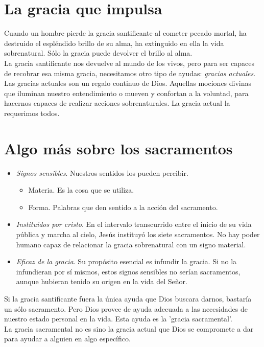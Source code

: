 \documentclass{article}
\begin{document}
    \section*{La gracia que impulsa}
       Cuando un hombre pierde la gracia santificante al cometer pecado mortal, ha destruido el espléndido brillo de su alma, ha extinguido en ella la vida sobrenatural. Sólo la gracia puede devolver el brillo al alma.\\ 
       La gracia santificante nos devuelve al mundo de los vivos, pero para ser capaces de recobrar esa misma gracia, necesitamos otro tipo de ayudas: \textit{gracias actuales}.\\ 
       Las gracias actuales son un regalo continuo de Dios. Aquellas mociones divinas que iluminan nuestro entendimiento o mueven y confortan a la voluntad, para hacernos capaces de realizar acciones sobrenaturales. La gracia actual la requerimos todos.
    \section*{Algo más sobre los sacramentos}
       \begin{itemize}
            \item \textit{Signos sensibles}. Nuestros sentidos los pueden percibir. 
            \begin{itemize}
                \item Materia. Es la cosa que se utiliza.
                \item Forma. Palabras que den sentido a la acción del sacramento. 
            \end{itemize}
            \item \textit{Instituidos por cristo}. En el intervalo transcurrido entre el inicio de su vida pública y marcha al cielo, Jesús instituyó los siete sacramentos. No hay poder humano capaz de relacionar la gracia sobrenatural con un signo material.  
            \item \textit{Eficaz de la gracia}. Su propósito esencial es infundir la gracia. Si no la infundieran por sí mismos, estos signos sensibles no serían sacramentos, aunque hubieran tenido su origen en la vida del Señor.
       \end{itemize}
       Si la gracia santificante fuera la única ayuda que Dios buscara darnos, bastaría un sólo sacramento. Pero Dios provee de ayuda adecuada a las necesidades de nuestro estado personal en la vida. Esta ayuda es la 'gracia sacramental'.\\
       La gracia sacramental no es sino la gracia actual que Dios se compromete a dar para ayudar a alguien en algo específico. 
\end{document}
